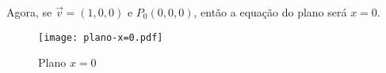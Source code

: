 \begin{exemplos}
\begin{enumerate}
\begin{solucao}
\begin{figure}[!h]
            \end{figure}
            Agora, se $\vec{v} = (1,0,0)$ e $P_0(0,0,0)$, ent\~ao a equa\c{c}\~ao do plano ser\'a $x = 0$.
            \begin{figure}[!h]
                \centering
                \caption{Plano $x = 0$}
                \texttt{[image: plano-x=0.pdf]}

\end{figure}
\end{solucao}
\end{enumerate}
\end{exemplos}
